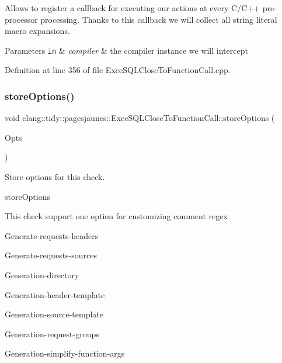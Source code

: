 Allows to register a callback for executing our actions at every C/\+C++ pre-\/processor processing. Thanks to this callback we will collect all string literal macro expansions.


\begin{DoxyParams}[1]{Parameters}
\mbox{\tt in}  & {\em compiler} & the compiler instance we will intercept \\
\hline
\end{DoxyParams}


Definition at line 356 of file Exec\+S\+Q\+L\+Close\+To\+Function\+Call.\+cpp.

\mbox{\label{classclang_1_1tidy_1_1pagesjaunes_1_1_exec_s_q_l_close_to_function_call_aea11c59499af73db355026396b009ad2}} 
\subsubsection{\texorpdfstring{store\+Options()}{storeOptions()}}
{\footnotesize\ttfamily void clang\+::tidy\+::pagesjaunes\+::\+Exec\+S\+Q\+L\+Close\+To\+Function\+Call\+::store\+Options (\begin{DoxyParamCaption}\item[{Clang\+Tidy\+Options\+::\+Option\+Map \&}]{Opts }\end{DoxyParamCaption})\hspace{0.3cm}{\ttfamily [override]}}



Store options for this check. 

store\+Options

This check support one option for customizing comment regex
\begin{DoxyItemize}
\item Generate-\/requests-\/headers
\item Generate-\/requests-\/sources
\item Generation-\/directory
\item Generation-\/header-\/template
\item Generation-\/source-\/template
\item Generation-\/request-\/groups
\item Generation-\/simplify-\/function-\/args
\end{DoxyItemize}


